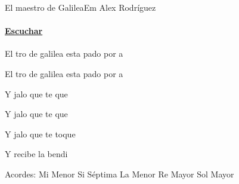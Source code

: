 \documentclass[12pt, spanish]{book}
\begin{document}
    \begin{song}{El maestro de Galilea}{Em}
    {} %
    {Alex Rodríguez}
    {} %
    {}
        \ifChordBk
            \paragraph{\mbox{}\hfill\protect\href{https://open.spotify.com/intl-es/track/6zLxr6n6tFeqmh2uNmBGGd}{Escuchar}\mbox{}\hfill}
        \fi


        \begin{SBOpGroup}
            El tro de galilea esta pado por a

            El tro de galilea esta pado por a
        \end{SBOpGroup}

        \begin{SBChorus}
            Y jalo que te que

            Y jalo que te que

            Y jalo que te toque

            Y recibe la bendi
        \end{SBChorus}

        \ifChordBk
        \begin{SBOpGroup}
            Acordes:\break
            \upchord{\Em}\qquad Mi Menor \hfill
            \upchord{\Bseven}\qquad Si S\'eptima \hfill\null\break
            \upchord{\Am}\qquad La Menor \hfill
            \upchord{\D}\qquad Re Mayor \hfill
            \upchord{\G}\qquad Sol Mayor \hfill\null\break
        \end{SBOpGroup}
        \fi
    \end{song}
\end{document}

